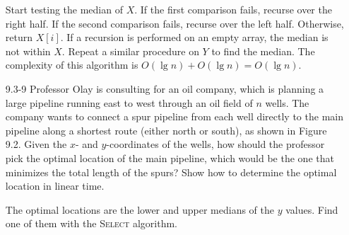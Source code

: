 \begin{enumerate}
\begin{framed}
Start testing the median of $X$. If the first comparison fails, recurse over the
right half. If the second comparison fails, recurse over the left half.
Otherwise, return $X[i]$. If a recursion is performed on an empty array, the
median is not within $X$. Repeat a similar procedure on $Y$ to find the median.
The complexity of this algorithm is $O(\lg n) + O(\lg n) = O(\lg n)$.
\end{framed}

\item[9.3-9]{Professor Olay is consulting for an oil company, which is planning
a large pipeline running east to west through an oil field of $n$ wells. The
company wants to connect a spur pipeline from each well directly to the main
pipeline along a shortest route (either north or south), as shown in Figure 9.2.
Given the $x$- and $y$-coordinates of the wells, how should the professor pick
the optimal location of the main pipeline, which would be the one that minimizes
the total length of the spurs? Show how to determine the optimal location in
linear time.}

\begin{framed}
The optimal locations are the lower and upper medians of the $y$ values. Find
one of them with the \textsc{Select} algorithm.
\end{framed}

\end{enumerate}

